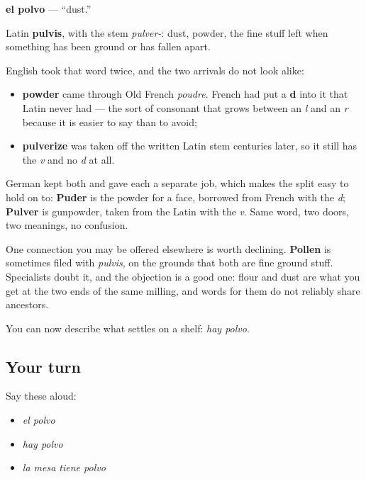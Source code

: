 \begin{cousinweb}
\textbf{el polvo} — \textquotedblleft{}dust.\textquotedblright{}

Latin \textbf{pulvis}, with the stem \emph{pulver-}: dust, powder, the fine stuff left when something has been ground or has fallen apart.

English took that word twice, and the two arrivals do not look alike:

\begin{itemize}
\raggedright
  \item \textbf{powder} came through Old French \emph{poudre}. French had put a \textbf{d} into it that Latin never had — the sort of consonant that grows between an \emph{l} and an \emph{r} because it is easier to say than to avoid;
  \item \textbf{pulverize} was taken off the written Latin stem centuries later, so it still has the \emph{v} and no \emph{d} at all.
\end{itemize}

German kept both and gave each a separate job, which makes the split easy to hold on to: \textbf{Puder} is the powder for a face, borrowed from French with the \emph{d}; \textbf{Pulver} is gunpowder, taken from the Latin with the \emph{v}. Same word, two doors, two meanings, no confusion.

One connection you may be offered elsewhere is worth declining. \textbf{Pollen} is sometimes filed with \emph{pulvis}, on the grounds that both are fine ground stuff. Specialists doubt it, and the objection is a good one: flour and dust are what you get at the two ends of the same milling, and words for them do not reliably share ancestors.
\end{cousinweb}

\begin{grammarlens}[title={What you've built}]
You can now describe what settles on a shelf: \emph{hay polvo}.
\end{grammarlens}

\subsection*{Your turn}
Say these aloud:

\begin{itemize}
\raggedright
  \item \emph{el polvo}
  \item \emph{hay polvo}
  \item \emph{la mesa tiene polvo}
\end{itemize}

